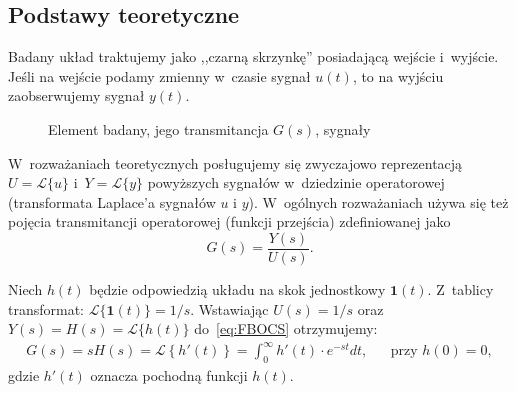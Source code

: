 \documentclass[paper=a4,DIV=12]{lpas}
\begin{document}
\begin{appendices}
  \section{Podstawy teoretyczne}
  \label{sec:K5NDO}

  Badany układ traktujemy jako ,,czarną skrzynkę'' posiadającą wejście i~wyjście.
  Jeśli na wejście podamy zmien\-ny w~czasie sygnał $u(t)$, to na wyjściu
  zaobserwujemy sygnał $y(t)$.
  \begin{figure}[htbp]
    \centering
    \caption{Element badany, jego transmitancja $G(s)$, sygnały}
    \label{fig:6TEOB}
  \end{figure}
  W~rozważaniach teoretycznych posługujemy się zwyczajowo reprezentacją
  $U = \mathscr{L}\{u\}$ i~$Y = \mathscr{L}\{y\}$ powyższych sygnałów
  w~dziedzinie operatorowej (transformata Laplace'a sygnałów $u$ i $y$).
  W~ogólnych rozważaniach używa się też pojęcia transmitancji operatorowej
  (funkcji przejścia) zdefiniowanej jako
  \begin{equation}
    G(s) = \frac{Y(s)}{U(s)}.
    \label{eq:FBOCS}
  \end{equation}

  Niech $h(t)$ będzie odpowiedzią układu na skok jednostkowy $\mathbf{1}(t)$.
  Z~tablicy transformat: $\mathscr{L}\{\mathbf{1}(t)\} = 1/s$. Wstawiając $U(s)
  = 1/s$ oraz $Y(s) = H(s) = \mathscr{L}\{h(t)\}$ do~\eqref{eq:FBOCS} otrzymujemy:
  \begin{equation}
    \begin{aligned}
      & G(s) = s H(s)
             = \mathscr{L}\left\{h'(t)\right\}
             = \int_0^{\infty} {h'(t) \cdot e^{-st} dt}, &
      & \text{przy } h(0) = 0, &
    \end{aligned}
    \label{eq:SQUJF}
  \end{equation}
  gdzie $h'(t)$ oznacza pochodną funkcji $h(t)$.


\end{appendices}
\end{document}
